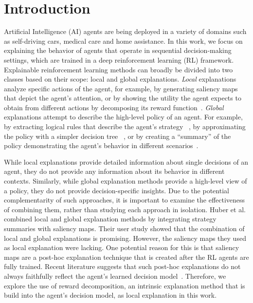 \documentclass[runningheads]{llncs}
\begin{document}
\section{Introduction}
Artificial Intelligence (AI) agents are being deployed in a variety of domains such as self-driving cars, medical care and home assistance. In this work, we focus on explaining the behavior of agents that operate in sequential decision-making settings, which are trained in a deep reinforcement learning (RL) framework. 
Explainable reinforcement learning methods can broadly be divided into two classes based on their scope: local and global explanations.
\emph{Local} explanations analyze specific actions of the agent, for example, by generating saliency maps~\cite{huber2019} that depict the agent's attention, or by showing the utility the agent expects to obtain from different actions by decomposing its reward function~\cite{juozapaitis2019explainable}.
\emph{Global} explanations attempt to describe the high-level policy of an agent.
For example, by extracting logical rules that describe the agent's strategy ~\cite{booth2019evaluating}, by approximating the policy with a simpler decision tree ~\cite{liu2019toward}, or by creating a ``summary'' of the policy demonstrating the agent's behavior in different scenarios~\cite{amir2019summarizing}. 

While local explanations provide detailed information about single decisions of an agent, they do not provide any information about its behavior in different contexts. Similarly, while global explanation methods provide a high-level view of a policy, they do not provide decision-specific insights. Due to the potential complementarity of such approaches, it is important to examine the effectiveness of combining them, rather than studying each approach in isolation. Huber et al.~\cite{huber2020local} combined local and global explanation methods by integrating strategy summaries with saliency maps. 
Their user study showed that the combination of local and global explanations is promising. 
However, the saliency maps they used as local explanation were lacking.
One potential reason for this is that saliency maps are a post-hoc explanation technique that is created after the RL agents are fully trained.
Recent literature suggests that such post-hoc explanations do not always faithfully reflect the agent's learned decision model~\cite{rudin19,huber2022benchmarking}.
Therefore, we explore the use of reward decomposition, an intrinsic explanation method that is build into the agent's decision model, as local explanation in this work.
\end{document}
